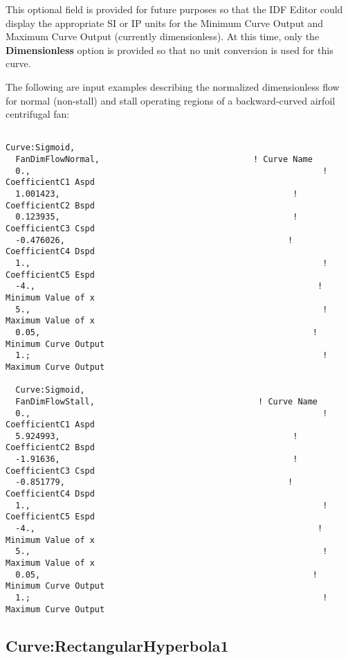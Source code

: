 This optional field is provided for future purposes so that the IDF Editor could display the appropriate SI or IP units for the Minimum Curve Output and Maximum Curve Output (currently dimensionless). At this time, only the \textbf{Dimensionless} option is provided so that no unit conversion is used for this curve.

The following are input examples describing the normalized dimensionless flow for normal (non-stall) and stall operating regions of a backward-curved airfoil centrifugal fan:

\begin{lstlisting}

Curve:Sigmoid,
  FanDimFlowNormal,                               ! Curve Name
  0.,                                                           ! CoefficientC1 Aspd
  1.001423,                                               ! CoefficientC2 Bspd
  0.123935,                                               ! CoefficientC3 Cspd
  -0.476026,                                             ! CoefficientC4 Dspd
  1.,                                                           ! CoefficientC5 Espd
  -4.,                                                         ! Minimum Value of x
  5.,                                                           ! Maximum Value of x
  0.05,                                                       ! Minimum Curve Output
  1.;                                                           ! Maximum Curve Output

  Curve:Sigmoid,
  FanDimFlowStall,                                 ! Curve Name
  0.,                                                           ! CoefficientC1 Aspd
  5.924993,                                               ! CoefficientC2 Bspd
  -1.91636,                                               ! CoefficientC3 Cspd
  -0.851779,                                             ! CoefficientC4 Dspd
  1.,                                                           ! CoefficientC5 Espd
  -4.,                                                         ! Minimum Value of x
  5.,                                                           ! Maximum Value of x
  0.05,                                                       ! Minimum Curve Output
  1.;                                                           ! Maximum Curve Output
\end{lstlisting}

\subsection{Curve:RectangularHyperbola1}\label{curverectangularhyperbola1}

